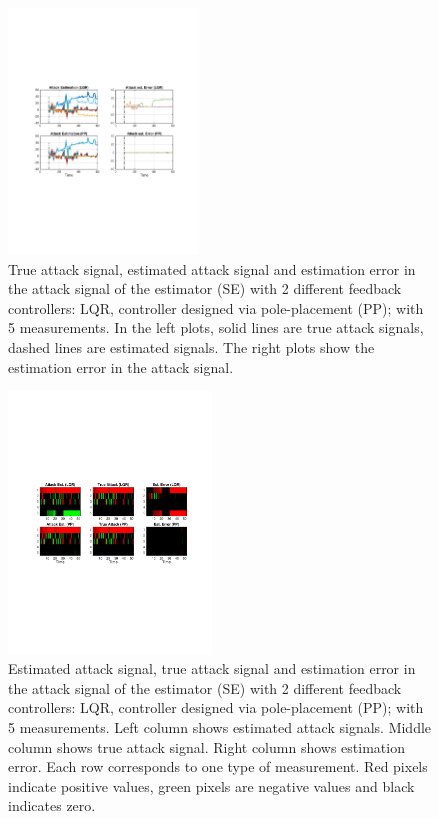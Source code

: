 \documentclass[../../thesis.tex]{subfiles}
\begin{document}
\begin{figure}
\center
\includegraphics[width=0.45\textwidth]{chapters/se_linear/figures/qh/uav_pp_est}
\caption{True attack signal, estimated attack signal and estimation error in the attack signal of the estimator (SE) with 2 different feedback controllers: LQR, controller designed via pole-placement (PP); with 5 measurements. In the left plots, solid lines are true attack signals, dashed lines are estimated signals. The right plots show the estimation error in the attack signal.}
\label{fig:ex_pp_est}
\end{figure}

\begin{figure}
\center
\includegraphics[width=0.48\textwidth]{chapters/se_linear/figures/qh/uav_pp_error.pdf}
\caption{Estimated attack signal, true attack signal and estimation error in the attack signal of the estimator (SE) with 2 different feedback controllers: LQR, controller designed via pole-placement (PP); with 5 measurements. Left column shows estimated attack signals. Middle column shows true attack signal. Right column shows estimation error. Each row corresponds to one type of measurement. Red pixels indicate positive values, green pixels are negative values and black indicates zero. }
\label{fig:ex_pp_err}
\end{figure}
\end{document}
